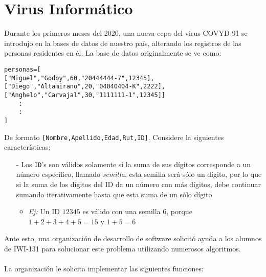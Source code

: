 \section{Virus Informático}
Durante los primeros meses del 2020, una nueva cepa del virus COVYD-91 se introdujo en la bases de datos de nuestro país, alterando los registros de las personas residentes en él. La base de datos originalmente se ve como:
\begin{lstlisting}[style=consola]
personas=[
["Miguel","Godoy",60,"20444444-7",12345],
["Diego","Altamirano",20,"04040404-K",2222],
["Anghelo","Carvajal",30,"1111111-1",12345]]
    :
    :
]
\end{lstlisting}
De formato \texttt{[Nombre,Apellido,Edad,Rut,ID]}. Considere la siguientes características;
\begin{itemize}
    \item [-] Los \texttt{ID}'s son válidos solamente si la suma de sus dígitos corresponde a un número específico, llamado \textit{semilla}, esta semilla será sólo un dígito, por lo que si la suma de los dígitos del ID da un número con más dígitos, debe continuar sumando iterativamente hasta que esta suma de un sólo dígito
    \begin{itemize}
        \item \textit{Ej:} Un ID $12345$ es válido con una semilla $6$, porque $1+2+3+4+5=15$ y $1+5=6$
    \end{itemize}
\end{itemize}
Ante esto, una organización de desarrollo de software solicitó ayuda a los alumnos de IWI-131 para solucionar este problema utilizando numerosos algoritmos.\\\\
La organización le solicita implementar las siguientes funciones:
